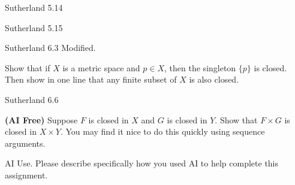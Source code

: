 \documentclass[minion]{homework}
\begin{document}
\begin{problems}

\problem Sutherland 5.14

\problem Sutherland 5.15

\problem Sutherland 6.3 Modified.

Show that if $X$ is a metric space and $p\in X$, then the singleton $\{p\}$ is closed.
Then show in one line that any finite subset of $X$ is also closed.

\problem Sutherland 6.6

\problem \textbf{(AI Free)} Suppose $F$ is closed in $X$ and $G$ is closed in $Y$.  Show 
that $F\times G$ is closed in $X \times Y$.  You may find it nice to
do this quickly using sequence arguments.

\problem AI Use. Please describe specifically how you used AI to help complete this assignment.

\end{problems}
\end{document}
